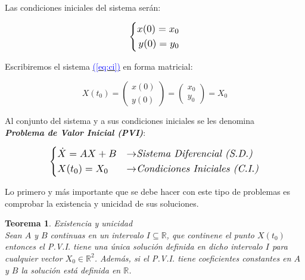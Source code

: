 \documentclass[12pt,a4paper]{report} %
\newtheorem{theorem}{Teorema}[chapter]
\newcommand{\eref}[1]{\hyperref[#1]{\textcolor{blue}{(\ref*{#1})}}}
\newcommand{\eref}[1]{\hyperref[#1]{\textcolor{blue}{\textit{(\ref*{#1})}}}}
\begin{document}
		\vspace{0.5cm}\noindent Las condiciones iniciales del sistema serán:
	
	\begin{equation}
		\label{eq:ci}
		\scalebox{1.2}{$\displaystyle
			\left\{
			\begin{aligned}
				x(0)=x_0 \\
			    y(0)=y_0
			\end{aligned}
			\right.
			$}
	\end{equation}\smallskip
	
	\vspace{0.5cm}\noindent Escribiremos el sistema \eref{eq:ci} en forma matricial:
	
	\begin{equation}
		\label{cimat}
		X(t_0)=\begin{pmatrix}
			x(0)\\y(0)
		\end{pmatrix}=\begin{pmatrix}
		x_0\\y_0
		\end{pmatrix}=X_0
	\end{equation}\smallskip
	
	\vspace{0.5cm}\noindent Al conjunto del sistema y a sus condiciones iniciales se les denomina \\ \textbf{\textit{Problema de Valor Inicial (PVI)}}: 
	
	\begin{equation}
	\label{eq:pvi}
	\scalebox{1.2}{$\displaystyle
		\left\{
		\begin{aligned}
			&\dot{X}=AX+B &\rightarrow& \textit{Sistema Diferencial (S.D.)}\\
			&X(t_0)=X_0 &\rightarrow& \textit{Condiciones Iniciales (C.I.)}
		\end{aligned}
		\right.
		$}
    \end{equation}\smallskip
	
	\vspace{0.5cm}\noindent Lo primero y más importante que se debe hacer con este tipo de problemas es comprobar la existencia y unicidad de sus soluciones.
	
	\begin{theorem}\label{thm:interesante}
		Existencia y unicidad \\[2mm]
		\textit{Sean $A$ y $B$ continuas en un intervalo $I\subseteq  \mathbb{R}$, que continene el punto $X(t_0)$ entonces el P.V.I. tiene una única solución definida en dicho intervalo $I$ para cualquier vector $X_0 \in \mathbb{R}^2$}. Además, si el P.V.I. tiene coeficientes constantes en $A$ y $B$ la solución está definida en $\mathbb{R}$.
	\end{theorem}
	\vspace{4mm}
	
\end{document}
